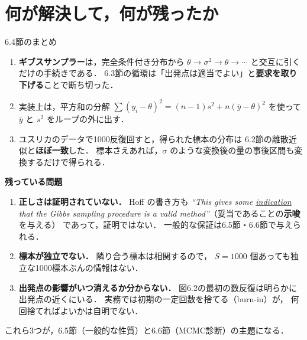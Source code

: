 \documentclass[lualatex,ja=standard,a4paper,12pt]{bxjsarticle}
\begin{document}
\section{何が解決して，何が残ったか}

\begin{thmbox}{6.4節のまとめ}
\begin{enumerate}
  \item \textbf{ギブスサンプラー}は，完全条件付き分布から
        $\theta \to \sigma^2 \to \theta \to \cdots$ と交互に引くだけの手続きである．
        6.3節の循環は「出発点は適当でよい」と\textbf{要求を取り下げる}ことで断ち切った．

  \item 実装上は，平方和の分解
        $\sum(y_i-\theta)^2 = (n-1)s^2 + n(\bar{y}-\theta)^2$ を使って
        $\bar{y}$ と $s^2$ をループの外に出す．

  \item ユスリカのデータで1000反復回すと，得られた標本の分布は
        6.2節の離散近似と\textbf{ほぼ一致}した．
        標本さえあれば，$\sigma$ のような変換後の量の事後区間も変換するだけで得られる．
\end{enumerate}
\end{thmbox}

\begin{warningbox}
\textbf{残っている問題}

\begin{enumerate}
  \item \textbf{正しさは証明されていない．}
        Hoff の書き方も
        \textit{``This gives some \underline{indication} that the Gibbs sampling
        procedure is a valid method''}（妥当であることの\textbf{示唆}を与える）
        であって，証明ではない．
        一般的な保証は6.5節・6.6節で与えられる．

  \item \textbf{標本が独立でない．}
        隣り合う標本は相関するので，
        $S = 1000$ 個あっても独立な1000標本ぶんの情報はない．

  \item \textbf{出発点の影響がいつ消えるか分からない．}
        図6.2の最初の数反復は明らかに出発点の近くにいる．
        実務では初期の一定回数を捨てる（burn-in）が，
        何回捨てればよいかは自明でない．
\end{enumerate}

\noindent これら3つが，6.5節（一般的な性質）と6.6節（MCMC診断）の主題になる．
\end{warningbox}
\end{document}
